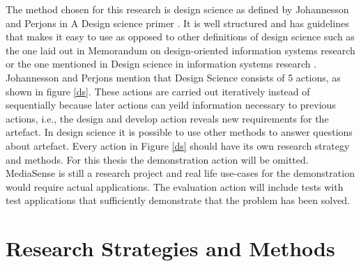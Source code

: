 The method chosen for this research is design science as defined by Johannesson and Perjons in A Design science primer \cite{johannesson2012design}. It is well structured and has guidelines that makes it easy to use as opposed to other definitions of design science such as the one laid out in Memorandum on design-oriented information systems research \cite{osterle2010memorandum} or the one mentioned in Design science in information systems research \cite{hevner2004design}. Johannesson and Perjons mention that Design Science consists of 5 actions, as shown in figure \ref{ds}. These actions are carried out iteratively instead of sequentially because later actions can yeild information necessary to previous actions, i.e., the design and develop action reveals new requirements for the artefact. In design science it is possible to use other methods to answer questions about artefact. Every action in Figure \ref{ds} should have its own research strategy and methods. For this thesis the demonstration action will be omitted. MediaSense is still a research project and real life use-cases for the demonstration would require actual applications. The evaluation action will include tests with test applications that sufficiently demonstrate that the problem has been solved.

\section{Research Strategies and Methods}





